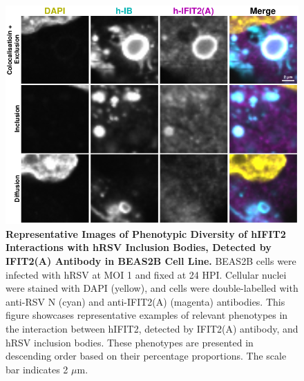 \begin{figure}
    \centering
    \includegraphics[width=1\linewidth]{08. Chapter 3/Figs/02. Infection/02. IFIT2/01. IFIT2A/12. i2a beas2b.pdf} 
    \caption[Representative Images of Phenotypic Diversity of hIFIT2 Interactions with hRSV Inclusion Bodies, Detected by IFIT2(A) Antibody in BEAS2B Cell Line.]{\textbf{Representative Images of Phenotypic Diversity of hIFIT2 Interactions with hRSV Inclusion Bodies, Detected by IFIT2(A) Antibody in BEAS2B Cell Line.} BEAS2B cells were infected with hRSV at MOI 1 and fixed at 24 HPI. Cellular nuclei were stained with DAPI (yellow), and cells were double-labelled with anti-RSV N (cyan) and anti-IFIT2(A) (magenta) antibodies. This figure showcases representative examples of relevant phenotypes in the interaction between hIFIT2, detected by IFIT2(A) antibody, and hRSV inclusion bodies. These phenotypes are presented in descending order based on their percentage proportions. The scale bar indicates 2 \(\mu \mbox{m}\).}
    \label{fig:Representative Images of Phenotypic Diversity of hIFIT2 Interactions with hRSV Inclusion Bodies, Detected by IFIT2(A) Antibody in BEAS2B Cell Line}
\end{figure}

